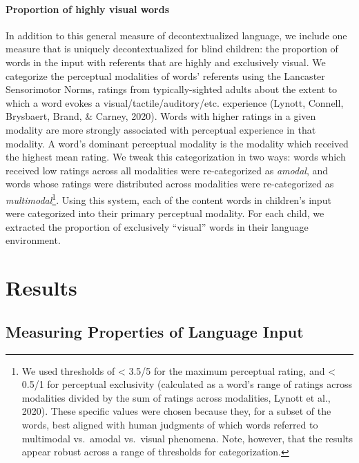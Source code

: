 \documentclass[
  man]{apa6}
\let\oldparagraph\paragraph
\renewcommand{\paragraph}[1]{\oldparagraph{#1}\mbox{}}
\begin{document}
\hypertarget{proportion-of-highly-visual-words}{%
\paragraph{Proportion of highly visual words}\label{proportion-of-highly-visual-words}}

In addition to this general measure of decontextualized language, we include one measure that is uniquely decontextualized for blind children: the proportion of words in the input with referents that are highly and exclusively visual. We categorize the perceptual modalities of words' referents using the Lancaster Sensorimotor Norms, ratings from typically-sighted adults about the extent to which a word evokes a visual/tactile/auditory/etc. experience (Lynott, Connell, Brysbaert, Brand, \& Carney, 2020). Words with higher ratings in a given modality are more strongly associated with perceptual experience in that modality. A word's dominant perceptual modality is the modality which received the highest mean rating. We tweak this categorization in two ways: words which received low ratings across all modalities were re-categorized as \emph{amodal}, and words whose ratings were distributed across modalities were re-categorized as \emph{multimodal}\footnote{We used thresholds of \textless{} 3.5/5 for the maximum perceptual rating, and \textless{} 0.5/1 for perceptual exclusivity (calculated as a word's range of ratings across modalities divided by the sum of ratings across modalities, Lynott et al., 2020). These specific values were chosen because they, for a subset of the words, best aligned with human judgments of which words referred to multimodal vs.~amodal vs.~visual phenomena. Note, however, that the results appear robust across a range of thresholds for categorization.}. Using this system, each of the content words in children's input were categorized into their primary perceptual modality. For each child, we extracted the proportion of exclusively ``visual'' words in their language environment.

\hypertarget{results}{%
\section{Results}\label{results}}

\hypertarget{measuring-properties-of-language-input}{%
\subsection{Measuring Properties of Language Input}\label{measuring-properties-of-language-input}}
\end{document}
